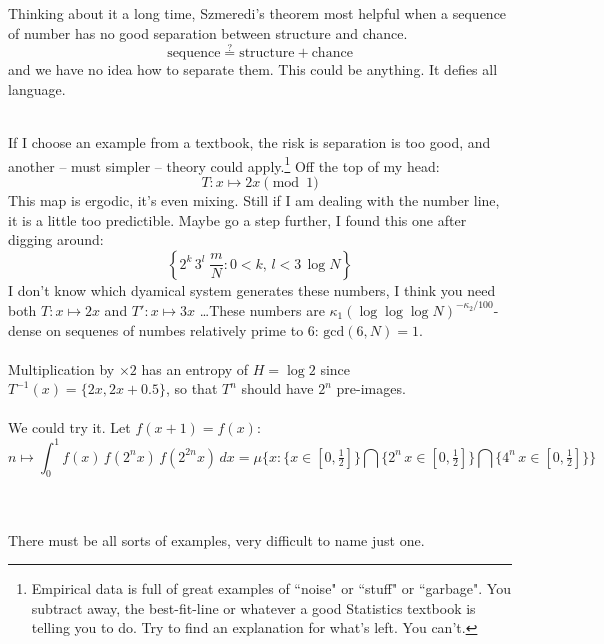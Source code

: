 \documentclass[12pt]{article}
\begin{document}
\noindent Thinking about it a long time, Szmeredi's theorem most helpful when a sequence of number has no good separation between structure and chance.
$$ \text{sequence} \stackrel{?}{=} \text{structure} + \text{chance} $$
and we have no idea how to separate them. This could be anything.  It defies all language.  \\ 
 \\ 
If I choose an example from a textbook, the risk is separation is too good, and another -- must simpler -- theory could apply.\footnote{Empirical data is full of great examples of ``noise" or ``stuff" or ``garbage".  You subtract away, the best-fit-line or whatever a good Statistics textbook is telling you to do.  Try to find an explanation for what's left.  You can't.  }   Off the top of my head:
$$ T : x \mapsto 2x \pmod 1$$
This map is ergodic, it's even mixing.  Still if I am dealing with the number line, it is a little too predictible.  Maybe go a step further, I found this one after digging around:
$$ \left\{ 2^k \, 3^l\; \frac{m}{N} : 0 < k, \, l < 3 \, \log N  \right\} $$ 
I don't know which dyamical system generates these numbers, I think you need both $T: x \mapsto 2x$ and $T': x \mapsto 3x$ \dots  These numbers are $\kappa_1 (\log \log \log N)^{-\kappa_2/100} $-dense on sequenes of numbes relatively prime to $6$:  $\text{gcd}(6, N) = 1$. \\ \\
Multiplication by $\times 2$ has an entropy of $H = \log 2$ since $T^{-1}(x) = \{ 2x , 2x + 0.5\}$, so that $T^n$ should have $2^n$ pre-images. \\ \\ 
We could try it.  Let $f(x+1)=f(x)$:
$$  n \mapsto \int_0^1 f(x) \, f( 2^n x ) \, f( 2^{2n} x ) \, dx  = \mu \Bigg\{ x : 
 \big\{  x \in [0, \tfrac{1}{2}] \big\} \bigcap 
 \big\{  2^n \, x \in [0, \tfrac{1}{2}] \big\} \bigcap
 \big\{  4^n \, x \in [0, \tfrac{1}{2}] \big\} \Bigg\} $$ \\ 
 \\ 
There must be all sorts of examples, very difficult to name just one.

\newpage
\end{document}
